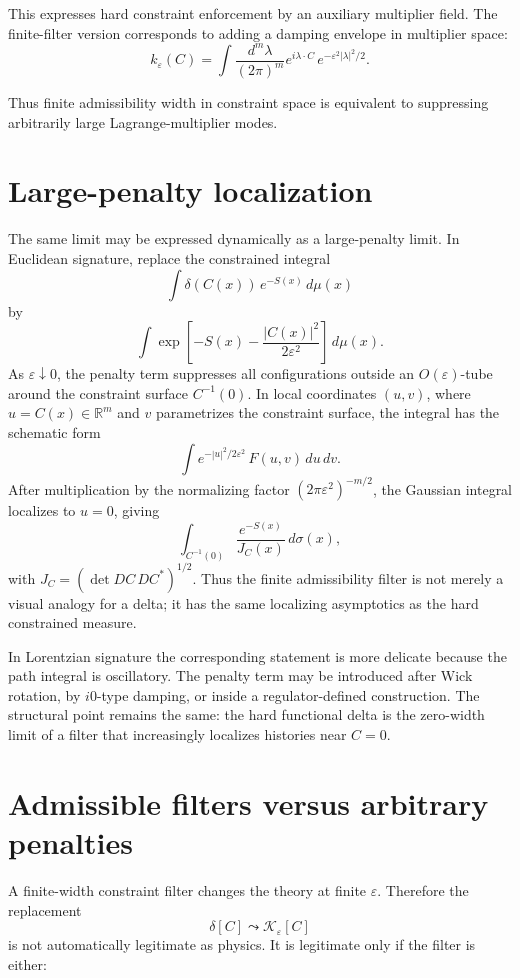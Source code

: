 \documentclass[11pt]{article}
\begin{document}
This expresses hard constraint enforcement by an auxiliary multiplier field.  The finite-filter
version corresponds to adding a damping envelope in multiplier space:
\[
k_\varepsilon(C)
=
\int \frac{d^m\lambda}{(2\pi)^m}
e^{i\lambda\cdot C}\,
e^{-\varepsilon^2|\lambda|^2/2}.
\]

Thus finite admissibility width in constraint space is equivalent to suppressing arbitrarily
large Lagrange-multiplier modes.


\section{Large-penalty localization}

The same limit may be expressed dynamically as a large-penalty limit.  In Euclidean
signature, replace the constrained integral
\[
\int \delta(C(x))\,e^{-S(x)}\,d\mu(x)
\]
by
\[
\int
\exp\!\left[-S(x)-\frac{|C(x)|^2}{2\varepsilon^2}\right]\,d\mu(x).
\]
As \(\varepsilon\downarrow0\), the penalty term suppresses all configurations outside an
\(O(\varepsilon)\)-tube around the constraint surface \(C^{-1}(0)\).  In local coordinates
\((u,v)\), where \(u=C(x)\in\mathbb R^m\) and \(v\) parametrizes the constraint surface,
the integral has the schematic form
\[
\int e^{-|u|^2/2\varepsilon^2}\,F(u,v)\,du\,dv .
\]
After multiplication by the normalizing factor \((2\pi\varepsilon^2)^{-m/2}\), the Gaussian
integral localizes to \(u=0\), giving
\[
\int_{C^{-1}(0)}
\frac{e^{-S(x)}}{J_C(x)}\,d\sigma(x),
\]
with \(J_C=(\det DC\,DC^\ast)^{1/2}\).  Thus the finite admissibility filter is not merely
a visual analogy for a delta; it has the same localizing asymptotics as the hard constrained
measure.

In Lorentzian signature the corresponding statement is more delicate because the path
integral is oscillatory.  The penalty term may be introduced after Wick rotation, by
\(i0\)-type damping, or inside a regulator-defined construction.  The structural point remains
the same: the hard functional delta is the zero-width limit of a filter that increasingly
localizes histories near \(C=0\).

\section{Admissible filters versus arbitrary penalties}

A finite-width constraint filter changes the theory at finite \(\varepsilon\).  Therefore the
replacement
\[
\delta[C]\leadsto \mathcal K_\varepsilon[C]
\]
is not automatically legitimate as physics.  It is legitimate only if the filter is either:
\end{document}
